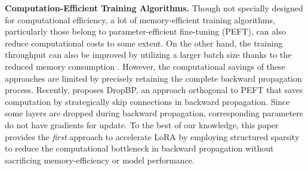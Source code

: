 \textbf{Computation-Efficient Training Algorithms. }Though not specially designed for computational efficiency, a lot of memory-efficient training algorithms, particularly  those belong to parameter-efficient fine-tuning (PEFT), can also reduce computational costs to some extent. On the other hand, the training throughput can also be improved by utilizing a larger batch size thanks to the reduced memory consumption \citep{zhu2024apollo}. However, the computational savings of these approaches are limited by precisely retaining the complete backward propagation process. Recently, \cite{woo2024dropbp} proposes DropBP, an approach orthogonal to PEFT that saves computation by strategically skip connections in backward propagation. Since some layers are dropped during backward propagation, corresponding parameters do not have gradients for update. To the best of our knowledge, this paper provides the \textit{first} approach to accelerate LoRA by employing structured sparsity to reduce the computational bottleneck in backward propagation without sacrificing memory-efficiency or model performance.

